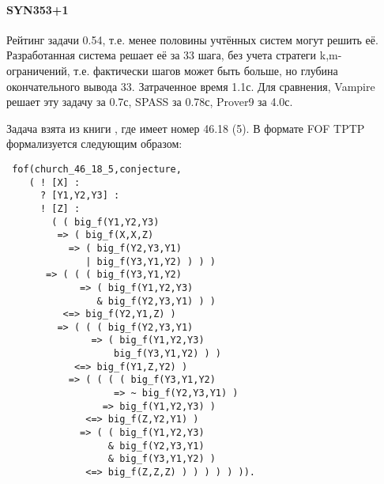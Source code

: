 
\paragraph{SYN353+1} Рейтинг задачи 0.54, т.е. менее половины учтённых систем могут решить её.
Разработанная система решает её за 33 шага, без учета стратеги k,m-ограничений, т.е. фактически шагов может быть больше, но глубина окончательного вывода 33. Затраченное время 1.1с. Для сравнения, Vampire решает эту задачу за 0.7с, SPASS за 0.78с, Prover9 за 4.0с.

Задача взята из книги \cite{Church1}, где имеет номер  46.18 (5). В формате FOF TPTP формализуется следующим образом:

\texttt{
{}fof(church\_46\_18\_5,conjecture,\\
{}~~~~(~!~[X]~:\\
{}~~~~~~?~[Y1,Y2,Y3]~:\\
{}~~~~~~!~[Z]~:\\
{}~~~~~~~~(~(~big\_f(Y1,Y2,Y3)\\
{}~~~~~~~~~=>~(~big\_f(X,X,Z)\\
{}~~~~~~~~~~~=>~(~big\_f(Y2,Y3,Y1)\\
{}~~~~~~~~~~~~~~|~big\_f(Y3,Y1,Y2)~)~)~)\\
{}~~~~~~~=>~(~(~(~big\_f(Y3,Y1,Y2)\\
{}~~~~~~~~~~~~~=>~(~big\_f(Y1,Y2,Y3)\\
{}~~~~~~~~~~~~~~~~\&~big\_f(Y2,Y3,Y1)~)~)\\
{}~~~~~~~~~~<=>~big\_f(Y2,Y1,Z)~)\\
{}~~~~~~~~~=>~(~(~(~big\_f(Y2,Y3,Y1)\\
{}~~~~~~~~~~~~~~~=>~(~big\_f(Y1,Y2,Y3)\\
{}~~~~~~~~~~~~~~~~~~~big\_f(Y3,Y1,Y2)~)~)\\
{}~~~~~~~~~~~~<=>~big\_f(Y1,Z,Y2)~)\\
{}~~~~~~~~~~~=>~(~(~(~(~big\_f(Y3,Y1,Y2)\\
{}~~~~~~~~~~~~~~~~~~~=>~\~~big\_f(Y2,Y3,Y1)~)\\
{}~~~~~~~~~~~~~~~~~=>~big\_f(Y1,Y2,Y3)~)\\
{}~~~~~~~~~~~~~~<=>~big\_f(Z,Y2,Y1)~)\\
{}~~~~~~~~~~~~~=>~(~(~big\_f(Y1,Y2,Y3)\\
{}~~~~~~~~~~~~~~~~~~\&~big\_f(Y2,Y3,Y1)\\
{}~~~~~~~~~~~~~~~~~~\&~big\_f(Y3,Y1,Y2)~)\\
{}~~~~~~~~~~~~~~<=>~big\_f(Z,Z,Z)~)~)~)~)~)~)).\\}



